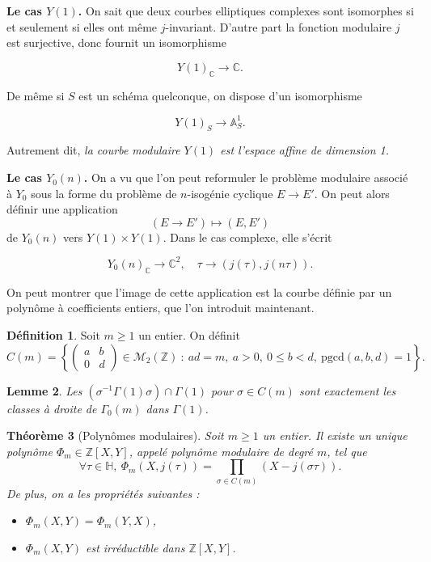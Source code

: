 \documentclass[11pt,a4paper]{article}
\newcommand{\Z}{\mathbb{Z}}
\newcommand{\C}{\mathbb{C}}
\newcommand{\A}{\mathbb{A}}
\renewcommand{\H}{\mathbb{H}}
\newcommand{\M}{\mathcal{M}}
\newcommand{\vers}{\rightarrow}
\newtheorem{thm}{Théorème}[subsection]
\newtheorem{lem}[thm]{Lemme}
\theoremstyle{definition}
\newtheorem{defi}[thm]{Définition}
\begin{document}
\textbf{Le cas $Y(1)$.} On sait que deux courbes elliptiques complexes sont isomorphes si et seulement si elles ont même $j$-invariant. D'autre part la fonction modulaire $j$ est surjective, donc fournit un isomorphisme

$$Y(1)_\C\vers \C.$$

De même si $S$ est un schéma quelconque, on dispose d'un isomorphisme

$$Y(1)_S\vers \A^1_S .$$

Autrement dit, \emph{la courbe modulaire $Y(1)$ est l'espace affine de dimension 1.}


\textbf{Le cas $Y_0(n)$.} On a vu que l'on peut reformuler le problème modulaire associé à $Y_0$ sous la forme du problème de $n$-isogénie cyclique $E\vers E'$. On peut alors définir une application
$$(E\vers E') \longmapsto (E, E')$$
de $Y_0(n)$ vers $Y(1)\times Y(1)$. Dans le cas complexe, elle s'écrit

$$Y_0(n)_\C \vers \C^2,\quad \tau\vers (j(\tau), j(n\tau)).$$

On peut montrer que l'image de cette application est la courbe définie par un polynôme à coefficients entiers, que l'on introduit maintenant.


\begin{defi}
Soit $m\geq 1$ un entier. On définit
$$C(m)=\left\{ 
\left(
\begin{matrix}
a & b \\
0 & d 
\end{matrix}
\right)
\in \M_2(\Z)\ :\ ad=m,\ a>0,\ 0\leq b<d,\ \mathrm{pgcd}(a,b,d)=1\right\}.$$
\end{defi}

\begin{lem}
Les $(\sigma^{-1}\Gamma(1)\sigma)\cap \Gamma(1)$ pour $\sigma\in C(m)$ sont exactement les classes à droite de $\Gamma_0(m)$ dans $\Gamma(1)$.
\end{lem}


\begin{thm}[Polynômes modulaires]

Soit $m\geq 1$ un entier. Il existe un unique  polynôme $\Phi_m \in \Z[X,Y]$, appelé \emph{polynôme modulaire} de degré $m$, tel que
$$\forall \tau\in\H,\ \Phi_m(X,j(\tau))=\prod_{\sigma\in C(m)} (X-j(\sigma\tau)).$$
De plus, on a les propriétés suivantes :

\begin{itemize}
\item[(i)] $\Phi_m(X,Y)=\Phi_m(Y,X)$,
\item[(ii)] $\Phi_m(X,Y)$ est irréductible dans $\Z[X,Y]$.
\end{itemize}

\end{thm}
\end{document}
